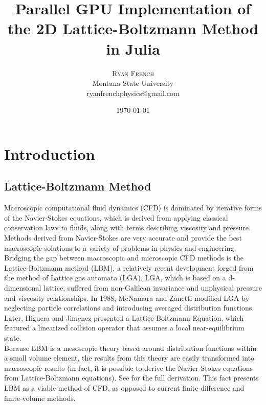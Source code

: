 \documentclass[twoside]{article}
\title{Parallel GPU Implementation of the 2D Lattice-Boltzmann Method in Julia} %
\author{%
\textsc{Ryan French} \\[1ex] %
\normalsize Montana State University \\ %
\normalsize ryanfrenchphysics@gmail.com %
}
\date{\today} %
\begin{document}
\setlength{\abovedisplayskip}{6pt}
\setlength{\belowdisplayskip}{6pt}

\maketitle


\section{Introduction}
\subsection*{Lattice-Boltzmann Method}

Macroscopic computational fluid dynamics (CFD) is dominated by iterative forms of the Navier-Stokes equations, which is derived from applying classical conservation laws to fluids, along with terms describing viscosity and pressure. Methods derived from Navier-Stokes are very accurate and provide the best macroscopic solutions to a variety of problems in physics and engineering. \\

\noindent Bridging the gap between macroscopic and microscopic CFD methods is the Lattice-Boltzmann method (LBM), a relatively recent development forged from the method of Lattice gas automata (LGA). LGA, which is based on a d-dimensional lattice, suffered from non-Galilean invariance and unphysical pressure and viscosity relationships. In 1988, McNamara and Zanetti\cite{McNamaraZanetti} modified LGA by neglecting particle correlations and introducing averaged distribution functions. Later, Higuera and Jimenez\cite{HigueraJimenez} presented a Lattice Boltzmann Equation, which featured a linearized collision operator that assumes a local near-equilibrium state\cite{PerumalDass:2015Review}.\\

\noindent Because LBM is a mesoscopic theory based around distribution functions within a small volume element, the results from this theory are easily transformed into macroscopic results (in fact, it is possible to derive the Navier-Stokes equations from Lattice-Boltzmann equations). See\cite{ChenDoolen} for the full derivation. This fact presents LBM as a viable method of CFD, as opposed to current finite-difference and finite-volume methods.\\
\end{document}
